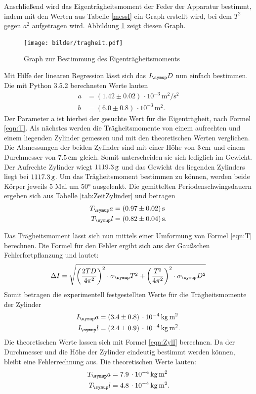 Anschließend wird das Eigenträgheitsmoment der Feder der Apparatur bestimmt,
indem mit den Werten aus Tabelle \ref{messI} ein Graph erstellt wird, bei dem
$T^2$ gegen $a^2$ aufgetragen wird. Abbildung \ref{fig:trag} zeigt diesen Graph.
\begin{figure}[H]
  \centering
  \texttt{[image: bilder/tragheit.pdf]}
  \caption{Graph zur Bestimmung des Eigenträgheitsmoments}
  \label{fig:trag}
\end{figure}
Mit Hilfe der linearen Regression lässt sich das $I_\su{D}$ nun einfach bestimmen.
Die mit Python 3.5.2 berechneten Werte lauten
\begin{align*}
  a &= (1.42 \pm 0.02)\,\cdot10^{-3} \,\si{\square\meter\per\square\second} \\
  b &= (6.0 \pm 0.8)\,\cdot10^{-3} \,\si{\square\meter}.
\end{align*}
Der Parameter a ist hierbei der gesuchte Wert für die Eigenträgheit, nach Formel \eqref{eqn:T}.
Als nächstes werden die Trägheitsmomente von einem aufrechten und einem liegenden
Zylinder gemessen und mit den theoretischen Werten verglichen. Die Abmessungen
der beiden Zylinder sind mit einer Höhe von $3\,\si{\centi\meter}$ und einem Durchmesser von $7.5\,\si{\centi\meter}$
gleich. Somit unterscheiden sie sich lediglich im Gewicht. Der Aufrechte Zylinder
wiegt $1119.3\,\si{\gram}$ und das Gewicht des liegenden Zylinders liegt bei $1117.3\,\si{\gram}$.
Um das Trägheitsmoment bestimmen zu können, werden beide Körper jeweils 5 Mal um
50° ausgelenkt. Die gemittelten Periodenschwingsdauern ergeben sich aus Tabelle
\ref{tab:ZeitZylinder} und betragen
\begin{align*}
  T_\su{a} &= (0.97 \pm 0.02)\sek \\
  T_\su{l} &= (0.82 \pm 0.04)\sek.
\end{align*}

Das Trägheitsmoment lässt sich nun mittels einer Umformung von Formel \eqref{eqn:T}
berechnen. Die Formel für den Fehler ergibt sich aus der Gaußschen Fehlerfortpflanzung
und lautet:
\begin{equation*}
  \Delta I = \sqrt{\biggl(\frac{2TD}{4\pi^2}\biggr)^2\cdot\sigma_\su{T}^2 +
  \biggl(\frac{T^2}{4\pi^2}\biggr)^2\cdot\sigma_\su{D}^2}
\end{equation*}
Somit betragen die experimentell festgestellten Werte für die Trägheitsmomente
der Zylinder
\begin{align*}
  I_\su{a} &= (3.4 \pm 0.8)\,\cdot10^{-4}\,\si{\kilo\gram\square\meter} \\
  I_\su{l} &= (2.4 \pm 0.9)\,\cdot10^{-4}\,\si{\kilo\gram\square\meter}.
\end{align*}
Die theoretischen Werte lassen sich mit Formel \eqref{eqn:ZylI} berechnen.
Da der Durchmesser und die Höhe der Zylinder eindeutig bestimmt werden können,
bleibt eine Fehlerrechnung aus.
Die theoretischen Werte lauten:
\begin{align}
  T_\su{a} &= 7.9\,\cdot10^{-4}\,\si{\kilo\gram\square\meter} \\
  T_\su{l} &= 4.8\,\cdot10^{-4}\,\si{\kilo\gram\square\meter}.
\end{align}

